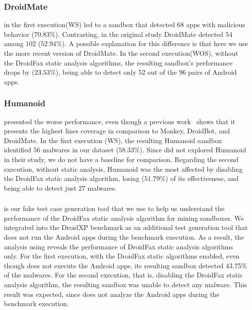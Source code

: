\subsubsection*{DroidMate} in the first execution(WS) led to a sandbox that detected 68 apps with malicious behavior ($70.83$\%). Contrasting, in the original study DroidMate detected $54$ among $102$ ($52.94$\%). A possible explanation for this difference is that here we use the more recent version of DroidMate. In the second execution(WOS), without the DroidFax static analysis algorithms, the resulting sandbox's performance drops by ($23.53$\%), being able to detect only 52 out of the 96 pairs of Android apps. 


\subsubsection*{Humanoid} presented the worse performance, even though a previous
work~\cite{DBLP:conf/kbse/LiY0C19} shows that it presents the highest lines coverage in comparison to Monkey, DroidBot, and DroidMate. In the first execution (WS), the resulting Humanoid sandbox identified $56$ malwares in our dataset ($58.33$\%). Since \blls did not explored Humanoid in their study, we do not have a baseline for comparison. Regarding the second execution, without static analysis, Humanoid was the most affected by disabling the DroidFax static analysis algorithm, losing ($51.79$\%) of its effectiveness, and being able to detect just $27$ malwares.

\subsubsection*{\joke} is our fake test case generation tool that we use to help us understand the performance of the DroidFax static analysis algorithm for mining sandboxes. We integrated \joke into the DroidXP benchmark as an additional test generation tool that does not run the Android apps during the benchmark execution. As a result, the analysis using \joke reveals the performance of DroidFax static analysis algorithms only. For the first execution, with the DroidFax static algorithms enabled, even though \joke does not execute the Android apps, its resulting sandbox detected 43.75\% of the malwares. For the second execution, that is, disabling the DroidFax static analysis algorithm, the resulting \joke sandbox was unable to detect any malware. This result was expected, since \joke does not analyze the Android apps during the benchmark execution.

